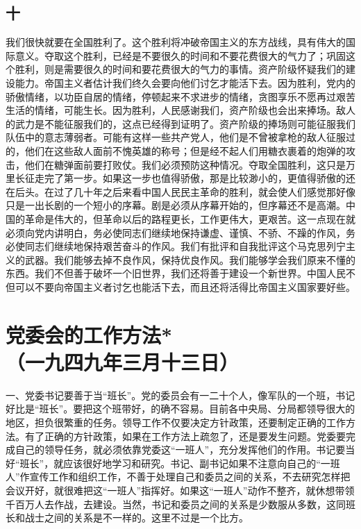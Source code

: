 \documentclass[cn,11pt,chinese]{elegantbook}
\def\myformat#1{\hfil\hfil #1}
\begin{document}
\subsection*{\myformat{十 }}
我们很快就要在全国胜利了。这个胜利将冲破帝国主义的东方战线，具有伟大的国际意义。夺取这个胜利，已经是不要很久的时间和不要花费很大的气力了；巩固这个胜利，则是需要很久的时间和要花费很大的气力的事情。资产阶级怀疑我们的建设能力。帝国主义者估计我们终久会要向他们讨乞才能活下去。因为胜利，党内的骄傲情绪，以功臣自居的情绪，停顿起来不求进步的情绪，贪图享乐不愿再过艰苦生活的情绪，可能生长。因为胜利，人民感谢我们，资产阶级也会出来捧场。敌人的武力是不能征服我们的，这点已经得到证明了。资产阶级的捧场则可能征服我们队伍中的意志薄弱者。可能有这样一些共产党人，他们是不曾被拿枪的敌人征服过的，他们在这些敌人面前不愧英雄的称号；但是经不起人们用糖衣裹着的炮弹的攻击，他们在糖弹面前要打败仗。我们必须预防这种情况。夺取全国胜利，这只是万里长征走完了第一步。如果这一步也值得骄傲，那是比较渺小的，更值得骄傲的还在后头。在过了几十年之后来看中国人民民主革命的胜利，就会使人们感觉那好像只是一出长剧的一个短小的序幕。剧是必须从序幕开始的，但序幕还不是高潮。中国的革命是伟大的，但革命以后的路程更长，工作更伟大，更艰苦。这一点现在就必须向党内讲明白，务必使同志们继续地保持谦虚、谨慎、不骄、不躁的作风，务必使同志们继续地保持艰苦奋斗的作风。我们有批评和自我批评这个马克思列宁主义的武器。我们能够去掉不良作风，保持优良作风。我们能够学会我们原来不懂的东西。我们不但善于破坏一个旧世界，我们还将善于建设一个新世界。中国人民不但可以不要向帝国主义者讨乞也能活下去，而且还将活得比帝国主义国家要好些。\\
\newpage\section*{\myformat{党委会的工作方法*}\\\myformat{（一九四九年三月十三日）}}
一、党委书记要善于当“班长”。党的委员会有一二十个人，像军队的一个班，书记好比是“班长”。要把这个班带好，的确不容易。目前各中央局、分局都领导很大的地区，担负很繁重的任务。领导工作不仅要决定方针政策，还要制定正确的工作方法。有了正确的方针政策，如果在工作方法上疏忽了，还是要发生问题。党委要完成自己的领导任务，就必须依靠党委这“一班人”，充分发挥他们的作用。书记要当好“班长”，就应该很好地学习和研究。书记、副书记如果不注意向自己的“一班人”作宣传工作和组织工作，不善于处理自己和委员之间的关系，不去研究怎样把会议开好，就很难把这“一班人”指挥好。如果这“一班人”动作不整齐，就休想带领千百万人去作战，去建设。当然，书记和委员之间的关系是少数服从多数，这同班长和战士之间的关系是不一样的。这里不过是一个比方。\\
\end{document}

